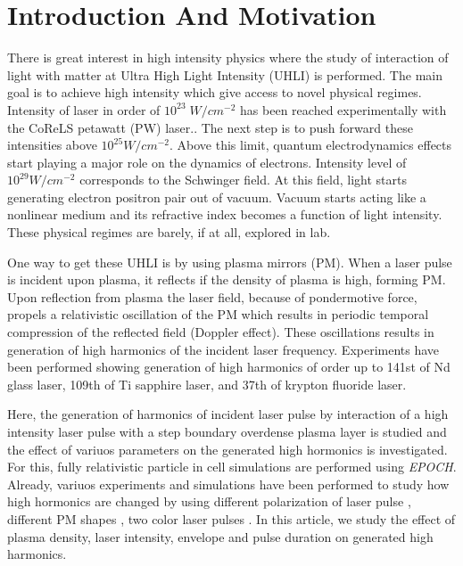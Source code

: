 \documentclass[12pt]{article}
\newenvironment{changemargin}[2]{
\begin{list}{}{
\setlength{\topsep}{0pt}
\setlength{\leftmargin}{#1}
\setlength{\rightmargin}{#2}
\setlength{\listparindent}{\parindent}
\setlength{\itemindent}{\parindent}
\setlength{\parsep}{\parskip}
}
\item[]}{\end{list}}
\begin{document}
\newpage
\begin{changemargin}{-2cm}{-2cm}
    \section{Introduction And Motivation}
    There is great interest in high intensity physics where the study of interaction of light with matter at Ultra High Light Intensity (UHLI) is performed. The main goal is to achieve high intensity which give access to novel physical regimes.\cite{henri}
    Intensity of laser in order of $10^{23} \; W/cm^{-2}$ has been reached experimentally with the CoReLS petawatt (PW) laser.\cite{highintensity}. The next step is to push forward these intensities above $10^{25}W/cm^{-2}$. Above this limit, quantum electrodynamics effects start playing a major role on the dynamics of electrons. Intensity level of $10^{29}W/cm^{-2}$ corresponds to the Schwinger field. At this field, light starts generating electron positron pair out of vacuum. Vacuum starts acting like a nonlinear medium and its refractive index becomes a function of light intensity. These physical regimes are barely, if at all, explored in lab.

    One way to get these UHLI is by using plasma mirrors (PM). When a laser pulse is incident upon plasma, it reflects if the density of plasma is high, forming PM. Upon reflection from plasma the laser field, because of pondermotive force, propels a relativistic oscillation of the PM which results in periodic temporal compression of the reflected field (Doppler effect). These oscillations results in generation of high harmonics of the incident laser frequency.\cite{lichters} Experiments have been performed showing generation of high harmonics of order up to 141st of Nd glass laser\cite{hormonics1}, 109th of Ti sapphire laser\cite{hormonics2}, and 37th of krypton fluoride laser\cite{hormonics3}.

    Here, the generation of harmonics of incident laser pulse by interaction of a high intensity laser pulse with a step boundary overdense plasma layer is studied and the effect of variuos parameters on the generated high hormonics is investigated. For this, fully relativistic particle in cell simulations are performed using \textit{EPOCH}. Already, variuos experiments and simulations have been performed to study how high hormonics are changed by using different polarization of laser pulse \cite{polarization1} \cite{polarization2}, different PM shapes \cite{henri}, two color laser pulses \cite{two-color1} \cite{two-color2}. In this article, we study the effect of plasma density, laser intensity, envelope and pulse duration on generated high harmonics.


\end{changemargin}
\end{document}
